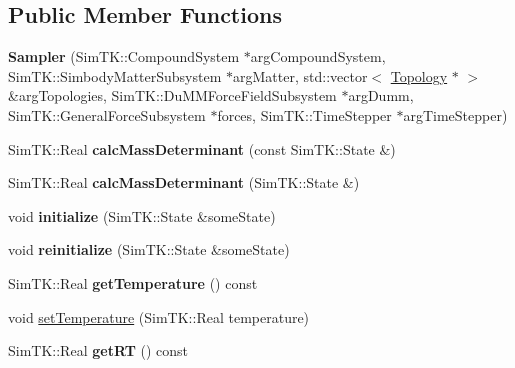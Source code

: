 \subsection*{Public Member Functions}
\begin{DoxyCompactItemize}
\item 
{\bfseries Sampler} (Sim\+T\+K\+::\+Compound\+System $\ast$arg\+Compound\+System, Sim\+T\+K\+::\+Simbody\+Matter\+Subsystem $\ast$arg\+Matter, std\+::vector$<$ \hyperlink{classTopology}{Topology} $\ast$ $>$ \&arg\+Topologies, Sim\+T\+K\+::\+Du\+M\+M\+Force\+Field\+Subsystem $\ast$arg\+Dumm, Sim\+T\+K\+::\+General\+Force\+Subsystem $\ast$forces, Sim\+T\+K\+::\+Time\+Stepper $\ast$arg\+Time\+Stepper)\hypertarget{classSampler_a1ff6da3170a6c479e3f61adcee82ae66}{}\label{classSampler_a1ff6da3170a6c479e3f61adcee82ae66}

\item 
Sim\+T\+K\+::\+Real {\bfseries calc\+Mass\+Determinant} (const Sim\+T\+K\+::\+State \&)\hypertarget{classSampler_a26ca57993693da9033b38474cc94a656}{}\label{classSampler_a26ca57993693da9033b38474cc94a656}

\item 
Sim\+T\+K\+::\+Real {\bfseries calc\+Mass\+Determinant} (Sim\+T\+K\+::\+State \&)\hypertarget{classSampler_ab5d6291d8839ac6b3a8da456377e7226}{}\label{classSampler_ab5d6291d8839ac6b3a8da456377e7226}

\item 
void {\bfseries initialize} (Sim\+T\+K\+::\+State \&some\+State)\hypertarget{classSampler_a8dc03cad5d5ed1ad6e8308ed449fbb3c}{}\label{classSampler_a8dc03cad5d5ed1ad6e8308ed449fbb3c}

\item 
void {\bfseries reinitialize} (Sim\+T\+K\+::\+State \&some\+State)\hypertarget{classSampler_a2370ac1b2d92f333451ace593f658ce0}{}\label{classSampler_a2370ac1b2d92f333451ace593f658ce0}

\item 
Sim\+T\+K\+::\+Real {\bfseries get\+Temperature} () const \hypertarget{classSampler_a32e49d15db5f08ad4ab3ee7dfa75ed51}{}\label{classSampler_a32e49d15db5f08ad4ab3ee7dfa75ed51}

\item 
void \hyperlink{classSampler_a74cb9a03076df1c093806acd3178ba4f}{set\+Temperature} (Sim\+T\+K\+::\+Real temperature)
\item 
Sim\+T\+K\+::\+Real {\bfseries get\+RT} () const \hypertarget{classSampler_a3ebad4cf7047e90a7f826c2c4b8e01e2}{}\label{classSampler_a3ebad4cf7047e90a7f826c2c4b8e01e2}


\end{DoxyCompactItemize}
